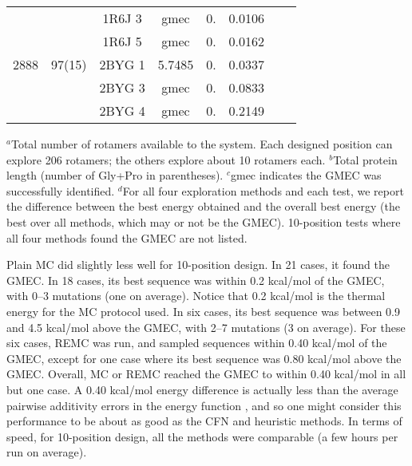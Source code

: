 \begin{table}[!htbp]
\begin{center}
\begin{tabular}{cccccccc}
      &         & 1R6J 3 & gmec& 0.     &  0.0106   &         \\       
      &         & 1R6J 5 & gmec& 0.     &  0.0162   &         \\        
2888  & 97(15)  & 2BYG 1 & 5.7485& 0.   &  0.0337   &         \\        
      &         & 2BYG 3 & gmec& 0.     &  0.0833   &         \\        
      &         & 2BYG 4 & gmec& 0.     &  0.2149   &         \\        
\hline
\end{tabular}
\end{center}
{\small \noindent $^a$Total number of rotamers available to the system. 
Each designed position can explore 206 rotamers; the others explore about 10 rotamers each. $^b$Total protein length (number of Gly+Pro in parentheses).
$^c$gmec indicates the GMEC was successfully identified. $^d$For all four exploration methods and each test, we report the difference between the best energy obtained and the overall best energy (the best over all methods, which may or not be the GMEC). 10-position tests where all four methods found the GMEC are not listed.
}
\end{table}



Plain MC did slightly less well for 10-position design. In 21 cases, it found the GMEC. In 18 cases, its best sequence was within 0.2 kcal/mol of the GMEC, with 0--3 mutations (one on average). Notice that 0.2 kcal/mol is the thermal energy for the MC protocol used. In six cases, its best sequence was between 0.9 and 4.5 kcal/mol above the GMEC, with 2--7 mutations (3 on average). For these six cases, REMC was run, and sampled sequences within 0.40 kcal/mol of the GMEC, except for one case where its best sequence was 0.80 kcal/mol above the GMEC. Overall, MC or REMC reached the GMEC to within 0.40 kcal/mol in all but one case. A 0.40 kcal/mol energy difference is actually less than the average pairwise additivity errors in the energy function \cite{Lopes07,Schmidt08b,Gaillard14}, and so one might consider this performance to be about as good as the CFN and heuristic methods. In terms of speed, for 10-position design, all the methods were comparable (a few hours per run on average).

